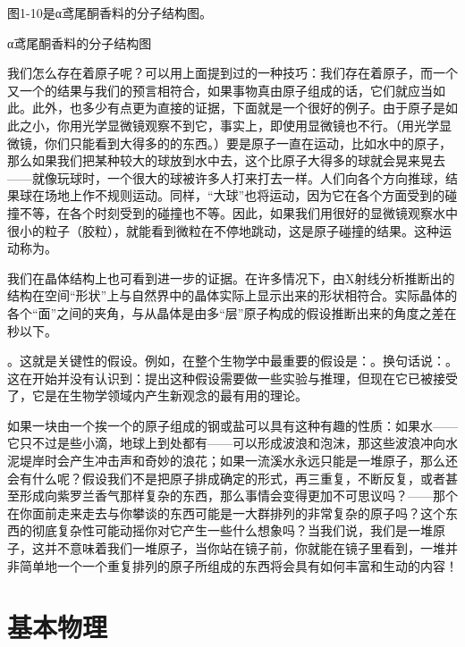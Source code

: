 \documentclass[12pt,oneside]{book}
\begin{document}
图1-10是α鸢尾酮香料的分子结构图。
\begin{fig}{α鸢尾酮香料的分子结构图}
\caption{α鸢尾酮香料的分子结构图}
\label{fig:α鸢尾酮香料的分子结构图}
\end{fig}

我们怎么存在着原子呢？可以用上面提到过的一种技巧：我们存在着原子，而一个又一个的结果与我们的预言相符合，如果事物真由原子组成的话，它们就应当如此。此外，也多少有点更为直接的证据，下面就是一个很好的例子。由于原子是如此之小，你用光学显微镜观察不到它，事实上，即使用显微镜也不行。（用光学显微镜，你们只能看到大得多的的东西。）要是原子一直在运动，比如水中的原子，那么如果我们把某种较大的球放到水中去，这个比原子大得多的球就会晃来晃去——就像玩球时，一个很大的球被许多人打来打去一样。人们向各个方向推球，结果球在场地上作不规则运动。同样，“大球”也将运动，因为它在各个方面受到的碰撞不等，在各个时刻受到的碰撞也不等。因此，如果我们用很好的显微镜观察水中很小的粒子（胶粒），就能看到微粒在不停地跳动，这是原子碰撞的结果。这种运动称为。

我们在晶体结构上也可看到进一步的证据。在许多情况下，由X射线分析推断出的结构在空间“形状”上与自然界中的晶体实际上显示出来的形状相符合。实际晶体的各个“面”之间的夹角，与从晶体是由多“层”原子构成的假设推断出来的角度之差在秒以下。

。这就是关键性的假设。例如，在整个生物学中最重要的假设是：。换句话说：。这在开始并没有认识到：提出这种假设需要做一些实验与推理，但现在它已被接受了，它是在生物学领域内产生新观念的最有用的理论。

如果一块由一个挨一个的原子组成的钢或盐可以具有这种有趣的性质：如果水——它只不过是些小滴，地球上到处都有——可以形成波浪和泡沫，那这些波浪冲向水泥堤岸时会产生冲击声和奇妙的浪花；如果一流溪水永远只能是一堆原子，那么还会有什么呢？假设我们不是把原子排成确定的形式，再三重复，不断反复，或者甚至形成向紫罗兰香气那样复杂的东西，那么事情会变得更加不可思议吗？——那个在你面前走来走去与你攀谈的东西可能是一大群排列的非常复杂的原子吗？这个东西的彻底复杂性可能动摇你对它产生一些什么想象吗？当我们说，我们是一堆原子，这并不意味着我们一堆原子，当你站在镜子前，你就能在镜子里看到，一堆并非简单地一个一个重复排列的原子所组成的东西将会具有如何丰富和生动的内容！



\chapter{基本物理}
\end{document}
